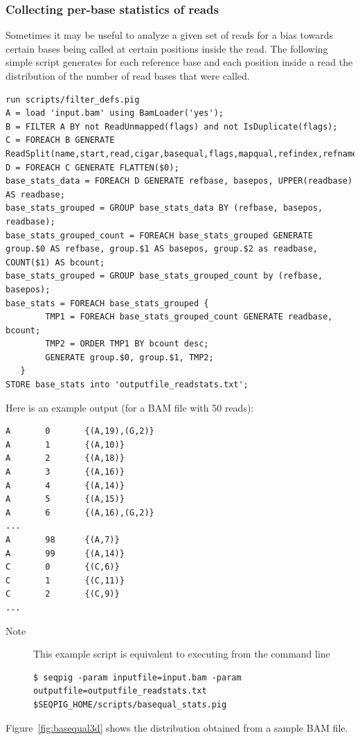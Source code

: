 {\subsubsection{Collecting per-base statistics of reads}
Sometimes it may be useful to analyze a given set of reads for a bias
towards certain bases being called at certain positions inside the
read. The following simple script generates for each reference base and
each position inside a read the distribution of the number of read bases
that were called.
\begin{lstlisting}
run scripts/filter_defs.pig
A = load 'input.bam' using BamLoader('yes');
B = FILTER A BY not ReadUnmapped(flags) and not IsDuplicate(flags);
C = FOREACH B GENERATE ReadSplit(name,start,read,cigar,basequal,flags,mapqual,refindex,refname,attributes#'MD');
D = FOREACH C GENERATE FLATTEN($0);
base_stats_data = FOREACH D GENERATE refbase, basepos, UPPER(readbase) AS readbase;
base_stats_grouped = GROUP base_stats_data BY (refbase, basepos, readbase);
base_stats_grouped_count = FOREACH base_stats_grouped GENERATE group.$0 AS refbase, group.$1 AS basepos, group.$2 as readbase, COUNT($1) AS bcount;
base_stats_grouped = GROUP base_stats_grouped_count by (refbase, basepos);
base_stats = FOREACH base_stats_grouped {
        TMP1 = FOREACH base_stats_grouped_count GENERATE readbase, bcount;
        TMP2 = ORDER TMP1 BY bcount desc;
        GENERATE group.$0, group.$1, TMP2;
   }
STORE base_stats into 'outputfile_readstats.txt';
\end{lstlisting}
Here is an example output (for a BAM file with 50 reads):
\begin{lstlisting}
A       0       {(A,19),(G,2)}
A       1       {(A,10)}
A       2       {(A,18)}
A       3       {(A,16)}
A       4       {(A,14)}
A       5       {(A,15)}
A       6       {(A,16),(G,2)}
...
A       98      {(A,7)}
A       99      {(A,14)}
C       0       {(C,6)}
C       1       {(C,11)}
C       2       {(C,9)}
...
\end{lstlisting}
\begin{description}
	\item[Note] This example script is equivalent to executing from the command line
\begin{lstlisting}
$ seqpig -param inputfile=input.bam -param outputfile=outputfile_readstats.txt $SEQPIG_HOME/scripts/basequal_stats.pig
\end{lstlisting}
\end{description}
Figure~\ref{fig:basequal3d} shows the distribution obtained from a sample BAM file.

}
